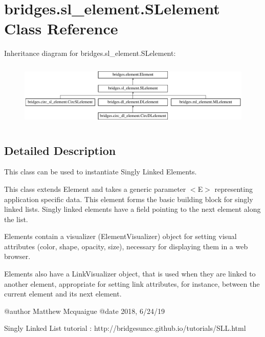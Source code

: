 \hypertarget{classbridges_1_1sl__element_1_1_s_lelement}{}\section{bridges.\+sl\+\_\+element.\+S\+Lelement Class Reference}
\label{classbridges_1_1sl__element_1_1_s_lelement}
Inheritance diagram for bridges.\+sl\+\_\+element.\+S\+Lelement\+:\begin{figure}[H]
\begin{center}
\leavevmode
\includegraphics[height=3.085400cm]{classbridges_1_1sl__element_1_1_s_lelement}
\end{center}
\end{figure}


\subsection{Detailed Description}
This class can be used to instantiate Singly Linked Elements. 

This class extends Element and takes a generic parameter $<$\+E$>$ representing application specific data. This element forms the basic building block for singly linked lists. Singly linked elements have a field pointing to the next element along the list.

\begin{DoxyVerb}Elements contain a visualizer (ElementVisualizer) object for setting visual
attributes (color, shape, opacity, size), necessary for displaying them in a
web browser.

Elements also have a LinkVisualizer object, that is used when they are linked to
another element, appropriate for setting link attributes, for instance, between
the current element and its next element.

@author Matthew Mcquaigue
@date  2018, 6/24/19

\sa Singly Linked List tutorial : http://bridgesuncc.github.io/tutorials/SLL.html\end{DoxyVerb}
